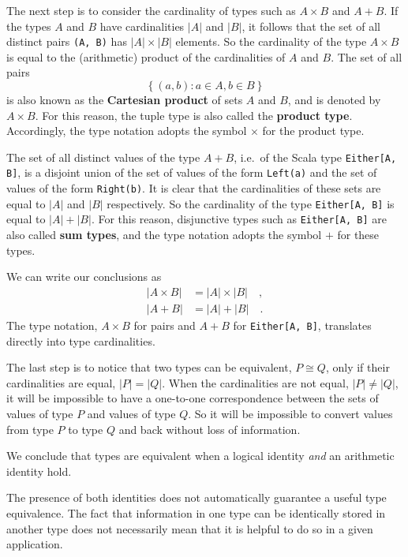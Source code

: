 The next step is to consider the cardinality of types such as $A\times B$
and $A+B$. If the types $A$ and $B$ have cardinalities $\left|A\right|$
and $\left|B\right|$, it follows that the set of all distinct pairs
\lstinline!(A, B)! has $\left|A\right|\times\left|B\right|$ elements.
So the cardinality of the type $A\times B$ is equal to the (arithmetic)
product of the cardinalities of $A$ and $B$. The set of all pairs
\[
\left\{ (a,b):a\in A,b\in B\right\} 
\]
is also known as the \textbf{Cartesian product}
of sets $A$ and $B$, and is denoted by $A\times B$. For this reason,
the tuple type is also called the \textbf{product
type}. Accordingly, the type notation adopts the symbol $\times$
for the product type.

The set of all distinct values of the type $A+B$, i.e.~of the Scala
type \lstinline!Either[A, B]!, is a disjoint union of the set of
values of the form \lstinline!Left(a)! and the set of values of the
form \lstinline!Right(b)!. It is clear that the cardinalities of
these sets are equal to $\left|A\right|$ and $\left|B\right|$ respectively.
So the cardinality of the type \lstinline!Either[A, B]! is equal
to $\left|A\right|+\left|B\right|$. For this reason, disjunctive
types such as \lstinline!Either[A, B]! are also called \textbf{sum
types}, and the type notation adopts the symbol $+$ for these types.

We can write our conclusions as
\begin{align*}
\left|A\times B\right| & =\left|A\right|\times\left|B\right|\quad,\\
\left|A+B\right| & =\left|A\right|+\left|B\right|\quad.
\end{align*}
The type notation, $A\times B$ for pairs and $A+B$ for \lstinline!Either[A, B]!,
translates directly into type cardinalities.

The last step is to notice that two types can be equivalent, $P\cong Q$,
only if their cardinalities are equal, $\left|P\right|=\left|Q\right|$.
When the cardinalities are not equal, $\left|P\right|\neq\left|Q\right|$,
it will be impossible to have a one-to-one correspondence between
the sets of values of type $P$ and values of type $Q$. So it will
be impossible to convert values from type $P$ to type $Q$ and back
without loss of information.

We conclude that types are equivalent when a logical identity \emph{and}
an arithmetic identity hold.

The presence of both identities does not automatically guarantee a
useful type equivalence. The fact that information in one type can
be identically stored in another type does not necessarily mean that
it is helpful to do so in a given application.

